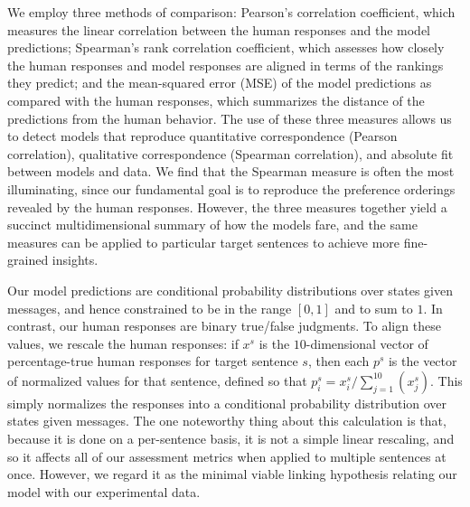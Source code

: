 \documentclass[leqno,12pt]{article}
\begin{document}
We employ three methods of comparison: Pearson's correlation
coefficient, which measures the linear correlation between the human
responses and the model predictions; Spearman's rank correlation
coefficient, which assesses how closely the human responses and model
responses are aligned in terms of the rankings they predict; and the
mean-squared error (MSE) of the model predictions as compared with the
human responses, which summarizes the distance of the predictions from
the human behavior. The use of these three measures allows us to
detect models that reproduce quantitative correspondence (Pearson
correlation), qualitative correspondence (Spearman correlation), and
absolute fit between models and data. We find that the Spearman
measure is often the most illuminating, since our fundamental goal is
to reproduce the preference orderings revealed by the human responses.
However, the three measures together yield a succinct multidimensional
summary of how the models fare, and the same measures can be applied
to particular target sentences to achieve more fine-grained insights.


Our model predictions are conditional probability distributions over
states given messages, and hence constrained to be in the range
$[0,1]$ and to sum to $1$. In contrast, our human responses are binary
true/false judgments. To align these values, we rescale the human
responses: if $x^{s}$ is the $10$-dimensional vector of
percentage-true human responses for target sentence $s$, then each
$p^{s}$ is the vector of normalized values for that sentence, defined
so that $p^{s}_{i} = x^{s}_{i}/\sum_{j=1}^{10}(x^{s}_{j})$. This
simply normalizes the responses into a conditional probability
distribution over states given messages. The one noteworthy thing
about this calculation is that, because it is done on a per-sentence
basis, it is not a simple linear rescaling, and so it affects all of
our assessment metrics when applied to multiple sentences at
once. However, we regard it as the minimal viable linking hypothesis
relating our model with our experimental data.
\end{document}

